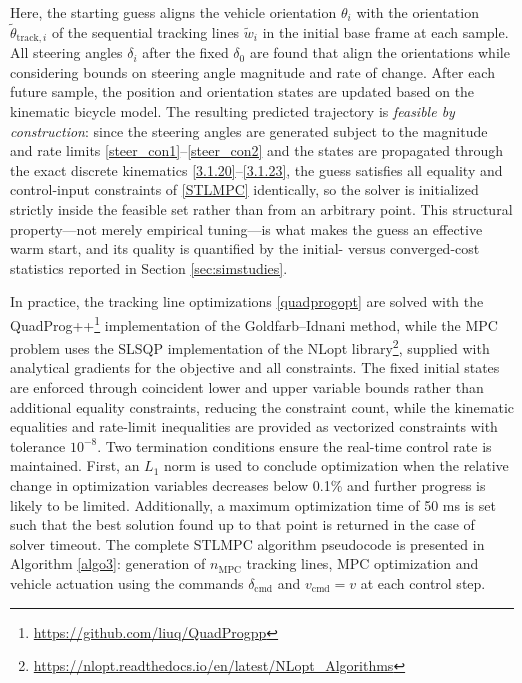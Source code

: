 \documentclass[journal]{IEEEtran}
\begin{document}
Here, the starting guess aligns the vehicle orientation $\theta_i$ with the orientation $\tilde \theta_{\text{track},i}$ of the sequential tracking lines $\tilde w_i$ in the initial base frame at each sample. All steering angles $\delta_i$ after the fixed $\delta_0$ are found that align the orientations while considering bounds on steering angle magnitude and rate of change. After each future sample, the position and orientation states are updated based on the kinematic bicycle model. The resulting predicted trajectory is \emph{feasible by construction}: since the steering angles are generated subject to the magnitude and rate limits \eqref{steer_con1}--\eqref{steer_con2} and the states are propagated through the exact discrete kinematics \eqref{3.1.20}--\eqref{3.1.23}, the guess satisfies all equality and control-input constraints of \eqref{STLMPC} identically, so the solver is initialized strictly inside the feasible set rather than from an arbitrary point. This structural property---not merely empirical tuning---is what makes the guess an effective warm start, and its quality is quantified by the initial- versus converged-cost statistics reported in Section \ref{sec:simstudies}.

In practice, the tracking line optimizations \eqref{quadprogopt} are solved with the QuadProg++\footnote{\url{https://github.com/liuq/QuadProgpp}} implementation of the Goldfarb--Idnani method, while the MPC problem uses the SLSQP implementation of the NLopt library\footnote{\url{https://nlopt.readthedocs.io/en/latest/NLopt_Algorithms}}, supplied with analytical gradients for the objective and all constraints. The fixed initial states are enforced through coincident lower and upper variable bounds rather than additional equality constraints, reducing the constraint count, while the kinematic equalities and rate-limit inequalities are provided as vectorized constraints with tolerance $10^{-8}$. Two termination conditions ensure the real-time control rate is maintained. First, an $L_1$ norm is used to conclude optimization when the relative change in optimization variables decreases below 0.1\% and further progress is likely to be limited. Additionally, a maximum optimization time of 50 ms is set such that the best solution found up to that point is returned in the case of solver timeout. The complete STLMPC algorithm pseudocode is presented in Algorithm \ref{algo3}: generation of $n_\text{MPC}$ tracking lines, MPC optimization and vehicle actuation using the commands $\delta_\text{cmd}$ and $v_\text{cmd}=v$ at each control step.
\end{document}
